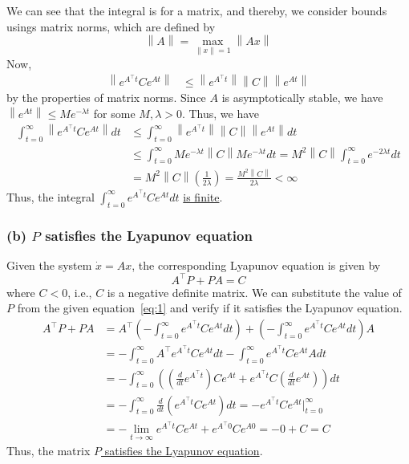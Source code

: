 We can see that the integral is for a matrix, and thereby, we consider bounds usings matrix norms, which are defined by
\begin{equation*}
    \left \| A \right \| = \max_{\left \| x \right \| = 1} \left \| A x \right \|
\end{equation*}
Now,
\begin{align*}
    \left \| e^{A^{\top} t} C e^{A t} \right \|
     & \leq
    \left \| e^{A^{\top} t} \right \| \left \| C \right \| \left \| e^{A t} \right \|
\end{align*}
by the properties of matrix norms.
Since \( A \) is asymptotically stable, we have \( \left \| e^{A t} \right \| \leq M e^{-\lambda t} \) for some \( M, \lambda > 0 \).
Thus, we have
\begin{align*}
    \int_{t=0}^{\infty} \left \| e^{A^{\top} t} C e^{A t} \right \| d t
     & \leq
    \int_{t=0}^{\infty} \left \| e^{A^{\top} t} \right \| \left \| C \right \| \left \| e^{A t} \right \| d t
    \\ & \leq
    \int_{t=0}^{\infty} M e^{-\lambda t} \left \| C \right \| M e^{-\lambda t} d t
    =
    M^2 \left \| C \right \| \int_{t=0}^{\infty} e^{-2 \lambda t} d t
    \\ & =
    M^2 \left \| C \right \| \left( \frac{1}{2 \lambda} \right)
    =
    \frac{M^2 \left \| C \right \|}{2 \lambda}
    <
    \infty
\end{align*}
Thus, the integral \( \displaystyle \int_{t=0}^{\infty} e^{A^{\top} t} C e^{A t} d t \) \underline{is finite}.

\subsubsection*{(b) \( P \) satisfies the Lyapunov equation}

Given the system \( \dot x = A x \), the corresponding Lyapunov equation is given by
\begin{equation*}
    A^{\top} P + P A = C
\end{equation*}
where \( C < 0 \), i.e., \( C \) is a negative definite matrix.
We can substitute the value of \( P \) from the given equation~\eqref{eq:1} and verify if it satisfies the Lyapunov equation.
\begin{align*}
    A^\top P + P A
     & =
    A^\top \left( -\int_{t=0}^{\infty} e^{A^{\top} t} C e^{A t} d t \right) + \left( -\int_{t=0}^{\infty} e^{A^{\top} t} C e^{A t} d t \right) A
    \\ & =
    -\int_{t=0}^{\infty} A^\top e^{A^{\top} t} C e^{A t} d t - \int_{t=0}^{\infty} e^{A^{\top} t} C e^{A t} A d t
    \\ & =
    -\int_{t=0}^{\infty} \left( \left( \frac{d}{dt} e^{A^{\top} t} \right) C e^{A t} + e^{A^{\top} t} C \left( \frac{d}{dt} e^{A t} \right) \right) d t
    \\ & =
    -\int_{t=0}^{\infty} \frac{d}{dt} \left( e^{A^{\top} t} C e^{A t} \right) d t
    =
    - e^{A^{\top} t} C e^{A t} \Big|_{t=0}^{\infty}
    \\ & =
    - \lim_{t \to \infty} e^{A^{\top} t} C e^{A t} + e^{A^{\top} 0} C e^{A 0}
    =
    - 0 + C
    =
    C
\end{align*}
Thus, the matrix \underline{\( P \) satisfies the Lyapunov equation}.

